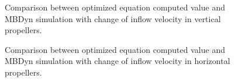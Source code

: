 \begin{figure}
    \centering
    \hfil %
    \caption{Comparison between optimized equation computed value and MBDyn simulation with change of inflow velocity in vertical propellers.}
    \label{fig:aero_rotor Wind V}
\end{figure}

\begin{figure}
    \centering
    \hfil %
    \caption{Comparison between optimized equation computed value and MBDyn simulation with change of inflow velocity in horizontal propellers.}
    \label{fig:aero_rotor Wind H}
\end{figure}

